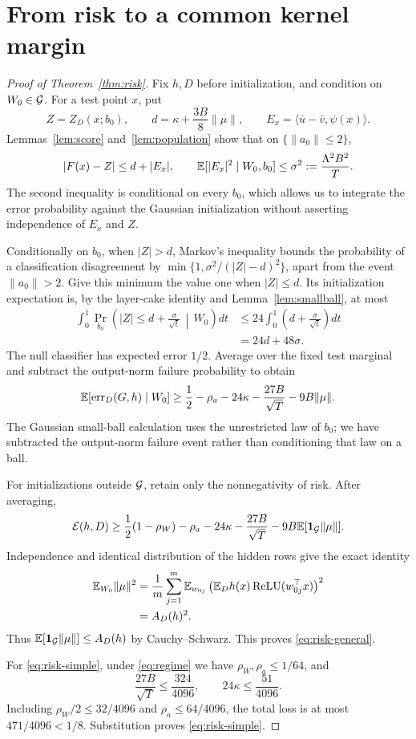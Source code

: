 \documentclass[11pt,letterpaper,pmlr,twoside]{jmlr}
\newcommand{\relu}{\operatorname{ReLU}}\newcommand{\dc}{\operatorname{dc}}
\newcommand{\err}{\operatorname{err}}\newcommand{\Risk}{\mathcal E}
\newcommand{\ind}{\mathbf1}\newcommand{\eps}{\varepsilon}
\newcommand{\ip}[2]{\langle #1,#2\rangle}\newcommand{\norm}[1]{\lVert #1\rVert}
\begin{document}
\section{From risk to a common kernel margin}
\label{app:margin}
\begin{proof}[Proof of Theorem~\ref{thm:risk}]
Fix $h,D$ before initialization, and condition on $W_0\in\mathcal G$. For a test point $x$, put
\[
 Z=Z_D(x;b_0),\qquad
 d=\kappa+\frac{3B}{8}\norm\mu,\qquad
 E_x=\ip{\bar u-\bar v}{\psi(x)}.
\]
Lemmas~\ref{lem:score} and~\ref{lem:population} show that on $\{\norm{a_0}\le2\}$,
\[
 |F(x)-Z|\le d+|E_x|,\qquad
 \mathbb E[|E_x|^2\mid W_0,b_0]\le\sigma^2:=\frac{\Lambda^2 B^2}{T}.
\]
The second inequality is conditional on every $b_0$, which allows us to integrate the error probability against the Gaussian initialization without asserting independence of $E_x$ and $Z$.

Conditionally on $b_0$, when $|Z|>d$, Markov's inequality bounds the probability of a classification disagreement by
$\min\{1,\sigma^2/(|Z|-d)^2\}$, apart from the event $\norm{a_0}>2$. Give this minimum the value one when $|Z|\le d$. Its initialization expectation is, by the layer-cake identity and Lemma~\ref{lem:smallball}, at most
\begin{align*}
 \int_0^1\Pr_{b_0}\left(|Z|\le d+\frac{\sigma}{\sqrt t}\,\middle|\,W_0\right)dt
 &\le24\int_0^1\left(d+\frac{\sigma}{\sqrt t}\right)dt\\
 &=24d+48\sigma.
\end{align*}
The null classifier has expected error $1/2$. Average over the fixed test marginal and subtract the output-norm failure probability to obtain
\[
 \E[\err_D(G,h)\mid W_0]
 \ge\frac12-\rho_a-24\kappa-\frac{27B}{\sqrt T}-9B\norm\mu.
\]
The Gaussian small-ball calculation uses the unrestricted law of $b_0$; we have subtracted the output-norm failure event rather than conditioning that law on a ball.

For initializations outside $\mathcal G$, retain only the nonnegativity of risk. After averaging,
\[
 \Risk(h,D)\ge\frac12(1-\rho_W)-\rho_a-24\kappa-\frac{27B}{\sqrt T}
       -9B\E[\ind_{\Gcal}\norm\mu].
\]
Independence and identical distribution of the hidden rows give the exact identity
\begin{align}
 \E_{W_0}\norm\mu^2
 &=\frac1m\sum_{j=1}^m\E_{w_{0j}}
       \left(\E_Dh(x)\relu(w_{0j}^\top x)\right)^2\notag\\
 &=A_D(h)^2.
 \label{eq:kernelidentity}
\end{align}
Thus $\E[\ind_{\Gcal}\norm\mu]\le A_D(h)$ by Cauchy--Schwarz. This proves \eqref{eq:risk-general}.

For \eqref{eq:risk-simple}, under \eqref{eq:regime} we have $\rho_W,\rho_a\le1/64$, and
\[
 \frac{27B}{\sqrt T}\le\frac{324}{4096},\qquad
 24\kappa\le\frac{51}{4096}.
\]
Including $\rho_W/2\le32/4096$ and $\rho_a\le64/4096$, the total loss is at most $471/4096<1/8$. Substitution proves \eqref{eq:risk-simple}.
\end{proof}
\end{document}
